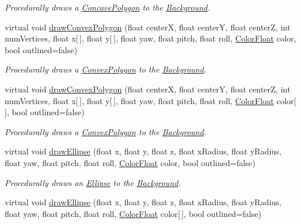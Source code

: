 \begin{DoxyCompactItemize}
\begin{DoxyCompactList}\small\item\em Procedurally draws a \hyperlink{classtsgl_1_1_concave_polygon}{Concave\+Polygon} to the \hyperlink{classtsgl_1_1_background}{Background}. \end{DoxyCompactList}\item 
virtual void \hyperlink{classtsgl_1_1_background_aefaf6bf296563f24592ae9cf60a3be4b}{draw\+Convex\+Polygon} (float centerX, float centerY, float centerZ, int num\+Vertices, float x\mbox{[}$\,$\mbox{]}, float y\mbox{[}$\,$\mbox{]}, float yaw, float pitch, float roll, \hyperlink{structtsgl_1_1_color_float}{Color\+Float} color, bool outlined=false)
\begin{DoxyCompactList}\small\item\em Procedurally draws a \hyperlink{classtsgl_1_1_convex_polygon}{Convex\+Polygon} to the \hyperlink{classtsgl_1_1_background}{Background}. \end{DoxyCompactList}\item 
virtual void \hyperlink{classtsgl_1_1_background_aaeecfb241259ec42e90c95967cf394fb}{draw\+Convex\+Polygon} (float centerX, float centerY, float centerZ, int num\+Vertices, float x\mbox{[}$\,$\mbox{]}, float y\mbox{[}$\,$\mbox{]}, float yaw, float pitch, float roll, \hyperlink{structtsgl_1_1_color_float}{Color\+Float} color\mbox{[}$\,$\mbox{]}, bool outlined=false)
\begin{DoxyCompactList}\small\item\em Procedurally draws a \hyperlink{classtsgl_1_1_convex_polygon}{Convex\+Polygon} to the \hyperlink{classtsgl_1_1_background}{Background}. \end{DoxyCompactList}\item 
virtual void \hyperlink{classtsgl_1_1_background_a9b73a13b8dfaa222c52f80883de97437}{draw\+Ellipse} (float x, float y, float z, float x\+Radius, float y\+Radius, float yaw, float pitch, float roll, \hyperlink{structtsgl_1_1_color_float}{Color\+Float} color, bool outlined=false)
\begin{DoxyCompactList}\small\item\em Procedurally draws an \hyperlink{classtsgl_1_1_ellipse}{Ellipse} to the \hyperlink{classtsgl_1_1_background}{Background}. \end{DoxyCompactList}\item 
virtual void \hyperlink{classtsgl_1_1_background_a11fe9a41bbeba5d67c8c5b1672a0c3a8}{draw\+Ellipse} (float x, float y, float z, float x\+Radius, float y\+Radius, float yaw, float pitch, float roll, \hyperlink{structtsgl_1_1_color_float}{Color\+Float} color\mbox{[}$\,$\mbox{]}, bool outlined=false)

\end{DoxyCompactItemize}
